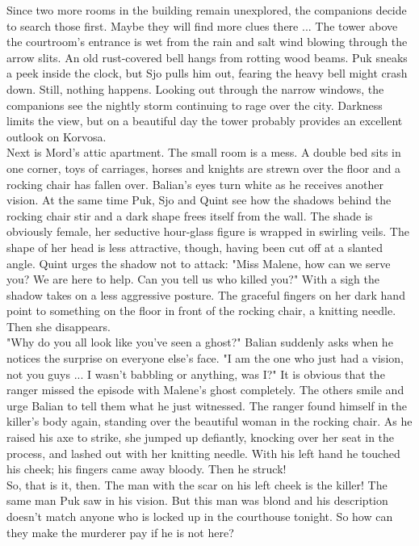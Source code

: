 Since two more rooms in the building remain unexplored, the companions decide to search those first. Maybe they will find more clues there ... The tower above the courtroom's entrance is wet from the rain and salt wind blowing through the arrow slits. An old rust-covered bell hangs from rotting wood beams. Puk sneaks a peek inside the clock, but Sjo pulls him out, fearing the heavy bell might crash down. Still, nothing happens. Looking out through the narrow windows, the companions see the nightly storm continuing to rage over the city. Darkness limits the view, but on a beautiful day the tower probably provides an excellent outlook on Korvosa.\\

Next is Mord's attic apartment. The small room is a mess. A double bed sits in one corner, toys of carriages, horses and knights are strewn over the floor and a rocking chair has fallen over. Balian's eyes turn white as he receives another vision. At the same time Puk, Sjo and Quint see how the shadows behind the rocking chair stir and a dark shape frees itself from the wall. The shade is obviously female, her seductive hour-glass figure is wrapped in swirling veils. The shape of her head is less attractive, though, having been cut off at a slanted angle. Quint urges the shadow not to attack: "Miss Malene, how can we serve you? We are here to help. Can you tell us who killed you?" With a sigh the shadow takes on a less aggressive posture. The graceful fingers on her dark hand point to something on the floor in front of the rocking chair, a knitting needle. Then she disappears.\\

"Why do you all look like you've seen a ghost?" Balian suddenly asks when he notices the surprise on everyone else's face. "I am the one who just had a vision, not you guys ... I wasn't babbling or anything, was I?" It is obvious that the ranger missed the episode with Malene's ghost completely. The others smile and urge Balian to tell them what he just witnessed. The ranger found himself in the killer's body again, standing over the beautiful woman in the rocking chair. As he raised his axe to strike, she jumped up defiantly, knocking over her seat in the process, and lashed out with her knitting needle. With his left hand he touched his cheek; his fingers came away bloody. Then he struck!\\

So, that is it, then. The man with the scar on his left cheek is the killer! The same man Puk saw in his vision. But this man was blond and his description doesn't match anyone who is locked up in the courthouse tonight. So how can they make the murderer pay if he is not here?\\

